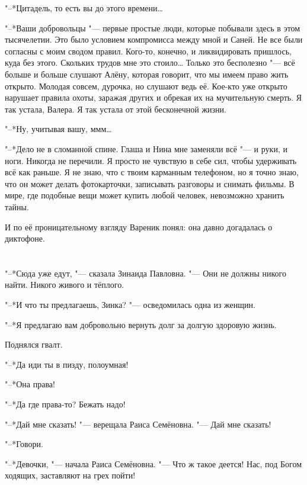 "--*Цитадель, то есть вы до этого времени\dots{}

"--*Ваши добровольцы "--- первые простые люди, которые побывали здесь в этом тысячелетии.
Это было условием компромисса между мной и Саней.
Не все были согласны с моим сводом правил.
Кого-то, конечно, и ликвидировать пришлось, куда без этого.
Скольких трудов мне это стоило\dots{}
Только это бесполезно "--- всё больше и больше слушают Алёну, которая говорит, что мы имеем право жить открыто.
Молодая совсем, дурочка, но слушают ведь её.
Кое-кто уже открыто нарушает правила охоты, заражая других и обрекая их на мучительную смерть.
Я так устала, Валера.
Я так устала от этой бесконечной жизни.

"--*Ну, учитывая вашу, ммм\dots{}

"--*Дело не в сломанной спине.
Глаша и Нина мне заменяли всё "--- и руки, и ноги.
Никогда не перечили.
Я просто не чувствую в себе сил, чтобы удерживать всё как раньше.
Я не знаю, что с твоим карманным телефоном, но я точно знаю, что он может делать фотокарточки, записывать разговоры и снимать фильмы.
В мире, где подобные вещи может купить любой человек, невозможно хранить тайны.

И по её проницательному взгляду Вареник понял: она давно догадалась о диктофоне.


\chapter{}

\textspace

"--*Сюда уже едут, "--- сказала Зинаида Павловна.
"--- Они не должны никого найти.
Никого живого и тёплого.

"--*И что ты предлагаешь, Зинка? "--- осведомилась одна из женщин.

"--*Я предлагаю вам добровольно вернуть долг за долгую здоровую жизнь.

Поднялся гвалт.

"--*Да иди ты в пизду, полоумная!

"--*Она права!

"--*Да где права-то?
Бежать надо!

"--*Дай мне сказать! "--- верещала Раиса Семёновна.
"--- Дай мне сказать!

"--*Говори.

"--*Девочки, "--- начала Раиса Семёновна.
"--- Что ж такое деется!
Нас, под Богом ходящих, заставляют на грех пойти!

